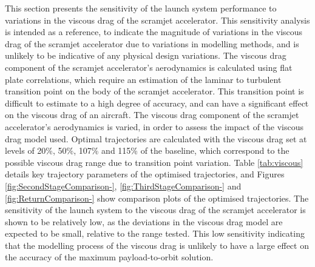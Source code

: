 This section presents the sensitivity of the launch system performance to variations in the viscous drag of the scramjet accelerator. This sensitivity analysis is intended as a reference, to indicate the magnitude of variations in the viscous drag of the scramjet accelerator due to variations in modelling methods, and is unlikely to be indicative of any physical design variations.
The viscous drag component of the scramjet accelerator's aerodynamics is calculated using flat plate correlations, which require an estimation of the laminar to turbulent transition point on the body of the scramjet accelerator\cite{Ward2018}. This transition point is difficult to estimate to a high degree of accuracy, and can have a significant effect on the viscous drag of an aircraft\cite{Ward2018}.
The viscous drag component of the scramjet accelerator's aerodynamics is varied, in order to assess the impact of the viscous drag model used. Optimal trajectories are calculated with the viscous drag set at levels of 20\%, 50\%, 107\% and 115\% of the baseline, which correspond to the possible viscous drag range due to transition point variation. Table \ref{tab:viscous} details key trajectory parameters of the optimised trajectories, and Figures \ref{fig:SecondStageComparison-}, \ref{fig:ThirdStageComparison-} and \ref{fig:ReturnComparison-} show comparison plots of the optimised trajectories. The sensitivity of the launch system to the viscous drag of the scramjet accelerator is shown to be relatively low, as the deviations in the viscous drag model are expected to be small, relative to the range tested. This low sensitivity indicating that the modelling process of the viscous drag is unlikely to have a large effect on the accuracy of the maximum payload-to-orbit solution.

